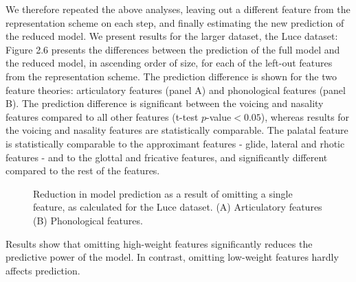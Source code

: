 We therefore repeated the above analyses, leaving out a different feature from the representation scheme on each step, and finally estimating the new prediction of the reduced model. We present results for the larger dataset, the Luce dataset: Figure 2.6 presents the differences between the prediction of the full model and the reduced model, in ascending order of size, for each of the left-out features from the representation scheme. The prediction difference is shown for the two feature theories: articulatory features (panel A) and phonological features (panel B). The prediction difference is significant between the voicing and nasality features compared to all other features (t-test $p$-value$<0.05$), whereas results for the voicing and nasality features are statistically comparable. The palatal feature is statistically comparable to the approximant features - glide, lateral and rhotic features - and to the glottal and fricative features, and significantly different compared to the rest of the features.

\begin{figure}[h]
\vspace{.3in}
\caption{Reduction in model prediction as a result of omitting a single feature, as calculated for the Luce dataset. (A) Articulatory features (B) Phonological features.}
\end{figure}

Results show that omitting high-weight features significantly reduces the predictive power of the model. In contrast, omitting low-weight features hardly affects prediction.

